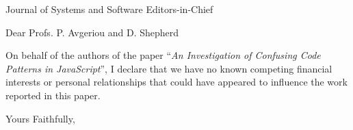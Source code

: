 \documentclass{letter}
\begin{document}
\begin{letter}{Journal of Systems and Software Editors-in-Chief}
  
\opening{Dear Profs. P. Avgeriou and D. Shepherd} 

On behalf of the authors of the
paper ``\emph{An Investigation of Confusing Code Patterns in JavaScript}'',
I declare that we have no known competing financial interests or personal relationships
that could have appeared to influence the work reported in this paper.

\closing{Yours Faithfully,}


\end{letter}
\end{document}
